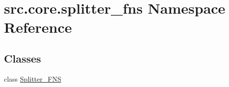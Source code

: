 \hypertarget{namespacesrc_1_1core_1_1splitter__fns}{}\section{src.\+core.\+splitter\+\_\+fns Namespace Reference}
\label{namespacesrc_1_1core_1_1splitter__fns}
\subsection*{Classes}
\begin{DoxyCompactItemize}
\item 
class \hyperlink{classsrc_1_1core_1_1splitter__fns_1_1Splitter__FNS}{Splitter\+\_\+\+F\+N\+S}
\end{DoxyCompactItemize}
